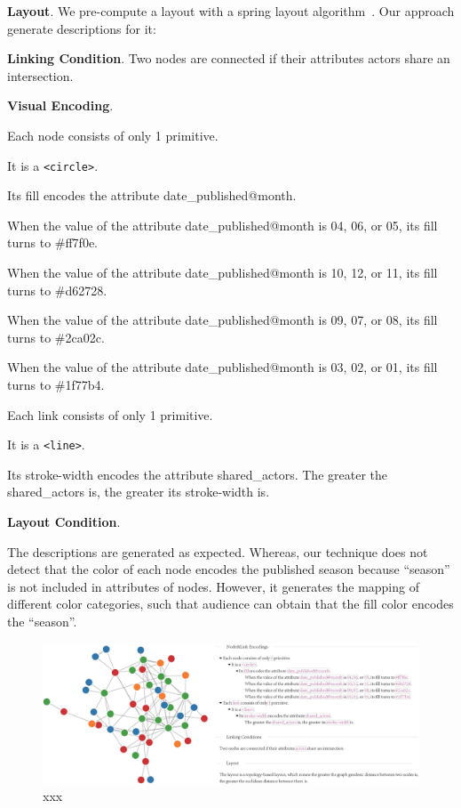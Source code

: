 \textbf{Layout}. We pre-compute a layout with a spring layout algorithm~\cite{DBLP:journals/spe/FruchtermanR91}.
Our approach generate descriptions for it:
\begin{compactitem}
    \item \textbf{Linking Condition}. Two nodes are connected if their attributes \colorbox{text-highlight}{\color{white}actors} share an intersection.
    \item \textbf{Visual Encoding}.
    \begin{compactitem}
        \item Each node consists of only 1 primitive.
        \item It is a \texttt{<circle>}. 
        \item Its fill encodes the attribute date\_published@month.
        \begin{compactitem}
            \item When the value of the attribute date\_published@month is 04, 06, or 05, its fill turns to \#ff7f0e.
            \item When the value of the attribute date\_published@month is 10, 12, or 11, its fill turns to \#d62728.
            \item When the value of the attribute date\_published@month is 09, 07, or 08, its fill turns to \#2ca02c.
            \item When the value of the attribute date\_published@month is 03, 02, or 01, its fill turns to \#1f77b4.
        \end{compactitem}
        \item Each link consists of only 1 primitive.
        \item It is a \texttt{<line>}.
        \item Its stroke-width encodes the attribute shared\_actors.
            The greater the shared\_actors is, the greater its stroke-width is.
    \end{compactitem}
    \item \textbf{Layout Condition}. 
\end{compactitem}

The descriptions are generated as expected.
Whereas, our technique does not detect that the color of each node encodes the published season because ``season'' is not included in attributes of nodes.
However, it generates the mapping of different color categories, such that audience can obtain that the fill color encodes the ``season''.

\begin{figure}
    \centering
    \includegraphics[width=1\columnwidth]{figures/iMDBMovies.eps}
    \caption{xxx}
    \label{fig:iMDBMovies}
\end{figure}



